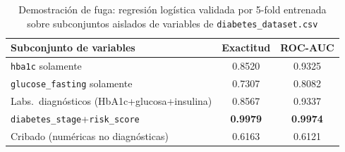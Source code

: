 \begin{table}[!t]
\renewcommand{\arraystretch}{1.2}
\caption{Demostración de fuga: regresión logística validada por 5-fold
entrenada sobre subconjuntos aislados de variables de
\texttt{diabetes\_dataset.csv}}
\label{tab:leakage}
\centering
\begin{tabular}{l c c}
\toprule
\textbf{Subconjunto de variables} & \textbf{Exactitud} & \textbf{ROC-AUC} \\
\midrule
\texttt{hba1c} solamente & 0.8520 & 0.9325 \\
\texttt{glucose\_fasting} solamente & 0.7307 & 0.8082 \\
Labs.\ diagnósticos (HbA1c+glucosa+insulina) & 0.8567 & 0.9337 \\
\texttt{diabetes\_stage}+\texttt{risk\_score} & \textbf{0.9979} & \textbf{0.9974} \\
\midrule
Cribado (numéricas no diagnósticas) & 0.6163 & 0.6121 \\
\bottomrule
\end{tabular}
\end{table}
